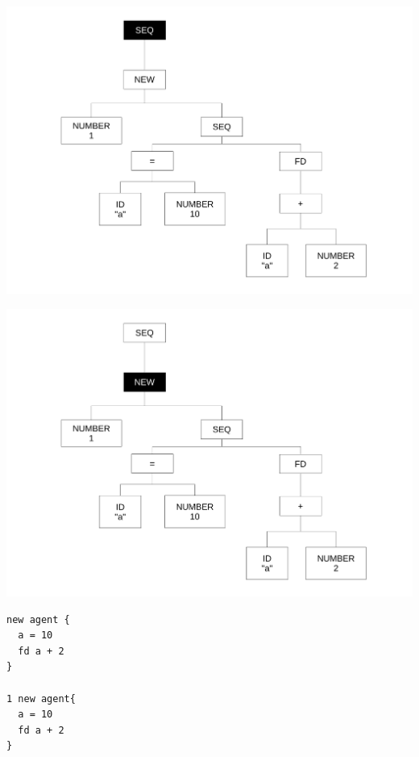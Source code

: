 
\begin{frame}
\includegraphics[scale=0.3]{doc/Presentation/img/arbre1.pdf}
\end{frame}

\begin{frame}
\includegraphics[scale=0.3]{doc/Presentation/img/arbre2.pdf}
\end{frame}

\begin{frame}[fragile]
	\begin{lstlisting}[language=Stibbons]
new agent {
  a = 10
  fd a + 2
}

1 new agent{
  a = 10
  fd a + 2
}
	\end{lstlisting}
\end{frame}

